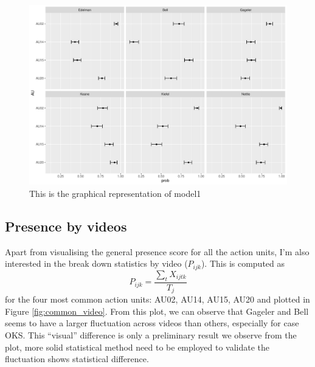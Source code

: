 \documentclass{monashthesis}
\begin{document}
\begin{figure}

{\centering \includegraphics[width=1\linewidth]{figures/unnamed-chunk-9-1} 

}

\caption{This is the graphical representation of model1\label{fig:model_1_plot}}\label{fig:unnamed-chunk-9}
\end{figure}

\hypertarget{presence-by-videos}{%
\subsection{Presence by videos}\label{presence-by-videos}}

Apart from visualising the general presence score for all the action units, I'm also interested in the break down statistics by video (\(P_{ijk}\)). This is computed as \[P_{ijk} = \frac{\sum_{t}X_{ijtk}}{T_j}\] for the four most common action units: AU02, AU14, AU15, AU20 and plotted in Figure \ref{fig:common_video}. From this plot, we can observe that Gageler and Bell seems to have a larger fluctuation across videos than others, especially for case OKS. This ``visual'' difference is only a preliminary result we observe from the plot, more solid statistical method need to be employed to validate the fluctuation shows statistical difference.
\end{document}
